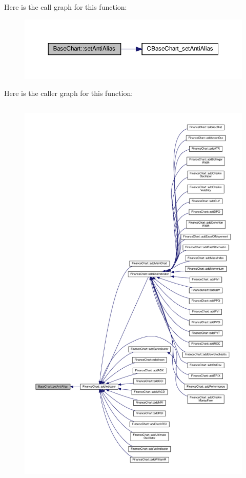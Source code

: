 Here is the call graph for this function\+:
\nopagebreak
\begin{figure}[H]
\begin{center}
\leavevmode
\includegraphics[width=350pt]{class_base_chart_a04c6e9606f39ad2dfbabb7d3d6b147e6_cgraph}
\end{center}
\end{figure}
Here is the caller graph for this function\+:
\nopagebreak
\begin{figure}[H]
\begin{center}
\leavevmode
\includegraphics[height=550pt]{class_base_chart_a04c6e9606f39ad2dfbabb7d3d6b147e6_icgraph}
\end{center}
\end{figure}
\mbox{\label{class_base_chart_ace729351109290982bc624323698cd6e}} 
